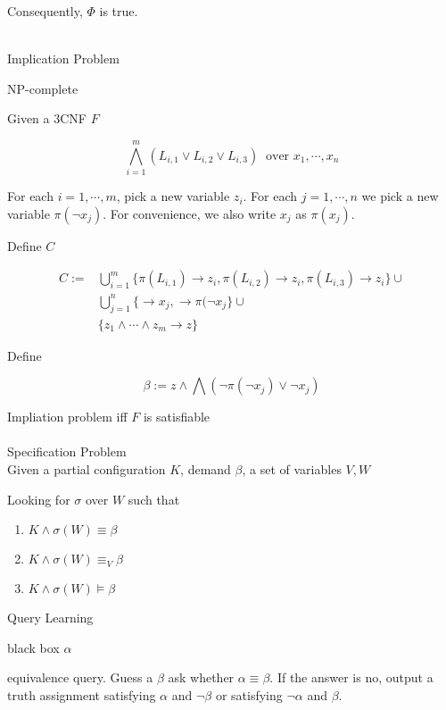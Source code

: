 \documentclass[12pt]{article}
\begin{document}
{Consequently, $\Phi$ is true.
 
\ \\

Implication Problem

NP-complete  

Given a 3CNF  $F$

$$\bigwedge_{i=1}^m (L_{i,1}\vee L_{i,2}\vee L_{i,3}) \ \mbox{ over } x_1,\cdots, x_n$$

For each $i=1,\cdots,m$, pick a new variable $z_i$. For each $j=1,\cdots, n$ we pick a new variable $\pi(\neg x_j)$. For convenience, we also write $x_j$ as $\pi(x_j)$. 

Define $C$ 

$$\begin{array}{ll}C:=&
\bigcup_{i=1}^m\{\pi(L_{i,1})\rightarrow z_i, \pi(L_{i,2})\rightarrow z_i, \pi(L_{i,3})\rightarrow z_i\}\cup\\ & \bigcup_{j=1}^n\{\rightarrow x_j, \rightarrow \pi(\neg x_j\} \cup\\ &
\{z_1\wedge\cdots\wedge z_m\rightarrow z\}\end{array}$$

Define 

$$\beta:=z\wedge\bigwedge (\neg \pi(\neg x_j)\vee \neg x_j)$$


Impliation problem iff $F$ is satisfiable \\


\ \\


Specification Problem\\

Given a partial configuration $K$, demand $\beta$, a set of variables $V,W$

Looking for $\sigma$ over $W$ such that

\begin{enumerate}
\item $K\wedge \sigma(W)\equiv \beta$

\item $K\wedge\sigma(W) \equiv_V\beta$

\item $K\wedge\sigma(W)\models \beta$
\end{enumerate}


Query Learning 

black box $\alpha$   

equivalence query. Guess a $\beta$ ask whether $\alpha\equiv \beta$. If the answer is no, output a truth assignment satisfying $\alpha$ and $\neg \beta$ or satisfying $\neg\alpha$ and $\beta$.\\

}
\end{document}
